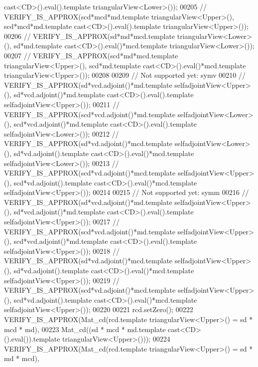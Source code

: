 \begin{DoxyCode}
{       cast<CD>().eval().template triangularView<Lower>());}
00205 \textcolor{comment}{//   VERIFY\_IS\_APPROX(scd*mcd*md.template triangularView<Upper>(), scd*mcd*md.template
       cast<CD>().eval().template triangularView<Upper>());}
00206 \textcolor{comment}{//   VERIFY\_IS\_APPROX(sd*md*mcd.template triangularView<Lower>(),  sd*md.template
       cast<CD>().eval()*mcd.template triangularView<Lower>());}
00207 \textcolor{comment}{//   VERIFY\_IS\_APPROX(scd*md*mcd.template triangularView<Upper>(), scd*md.template
       cast<CD>().eval()*mcd.template triangularView<Upper>());}
00208 
00209   \textcolor{comment}{// Not supported yet: symv}
00210 \textcolor{comment}{//   VERIFY\_IS\_APPROX(sd*vcd.adjoint()*md.template selfadjointView<Upper>(),  sd*vcd.adjoint()*md.template
       cast<CD>().eval().template selfadjointView<Upper>());}
00211 \textcolor{comment}{//   VERIFY\_IS\_APPROX(scd*vcd.adjoint()*md.template selfadjointView<Lower>(), scd*vcd.adjoint()*md.template
       cast<CD>().eval().template selfadjointView<Lower>());}
00212 \textcolor{comment}{//   VERIFY\_IS\_APPROX(sd*vd.adjoint()*mcd.template selfadjointView<Lower>(),  sd*vd.adjoint().template
       cast<CD>().eval()*mcd.template selfadjointView<Lower>());}
00213 \textcolor{comment}{//   VERIFY\_IS\_APPROX(scd*vd.adjoint()*mcd.template selfadjointView<Upper>(), scd*vd.adjoint().template
       cast<CD>().eval()*mcd.template selfadjointView<Upper>());}
00214 
00215   \textcolor{comment}{// Not supported yet: symm}
00216 \textcolor{comment}{//   VERIFY\_IS\_APPROX(sd*vcd.adjoint()*md.template selfadjointView<Upper>(),  sd*vcd.adjoint()*md.template
       cast<CD>().eval().template selfadjointView<Upper>());}
00217 \textcolor{comment}{//   VERIFY\_IS\_APPROX(scd*vcd.adjoint()*md.template selfadjointView<Upper>(), scd*vcd.adjoint()*md.template
       cast<CD>().eval().template selfadjointView<Upper>());}
00218 \textcolor{comment}{//   VERIFY\_IS\_APPROX(sd*vd.adjoint()*mcd.template selfadjointView<Upper>(),  sd*vd.adjoint().template
       cast<CD>().eval()*mcd.template selfadjointView<Upper>());}
00219 \textcolor{comment}{//   VERIFY\_IS\_APPROX(scd*vd.adjoint()*mcd.template selfadjointView<Upper>(), scd*vd.adjoint().template
       cast<CD>().eval()*mcd.template selfadjointView<Upper>());}
00220 
00221   rcd.setZero();
00222   VERIFY\_IS\_APPROX(Mat\_cd(rcd.template triangularView<Upper>() = sd * mcd * md),
00223                    Mat\_cd((sd * mcd * md.template cast<CD>().eval()).\textcolor{keyword}{template} triangularView<Upper>()));
00224   VERIFY\_IS\_APPROX(Mat\_cd(rcd.template triangularView<Upper>() = sd * md * mcd),

\end{DoxyCode}
